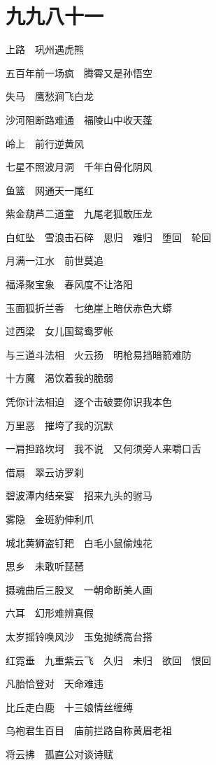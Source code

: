 \section{\texorpdfstring{\fontcn}{}九九八十一}
{\fontcn

上路　巩州遇虎熊

五百年前一场疯　腾霄又是孙悟空

失马　鹰愁涧飞白龙

沙河阻断路难通　福陵山中收天蓬 

岭上　前行逆黄风

七星不照波月洞　千年白骨化阴风 

鱼篮　网通天一尾红

紫金葫芦二道童　九尾老狐敢压龙

\bigskip

白虹坠　雪浪击石碎　思归　难归　堕回　轮回

月满一江水　前世莫追

\bigskip

福泽聚宝象　春风度不让洛阳 

玉面狐折兰香　七绝崖上暗伏赤色大蟒 

过西梁　女儿国鸳鸯罗帐

与三道斗法相　火云扬　明枪易挡暗箭难防

十方魔　渴饮着我的脆弱

凭你计法相迫　逐个击破要你识我本色

万里恶　摧垮了我的沉默

一肩担路坎坷　我不说　又何须旁人来嚼口舌

\bigskip

借扇　翠云访罗刹

碧波潭内结亲宴　招来九头的驸马 

雾隐　金斑豹伸利爪

城北黄狮盗钉耙　白毛小鼠偷烛花 

思乡　未敢听琵琶

摄魂曲后三股叉　一朝命断美人画

六耳　幻形难辨真假

太岁摇铃唤风沙　玉兔抛绣高台搭

\bigskip

红霓垂　九重紫云飞　久归　未归　欲回　恨回

凡胎恰登对　天命难违

\bigskip

比丘走白鹿　十三娘情丝缠缚

乌袍君生百目　庙前拦路自称黄眉老祖 

将云拂　孤直公对谈诗赋

}

